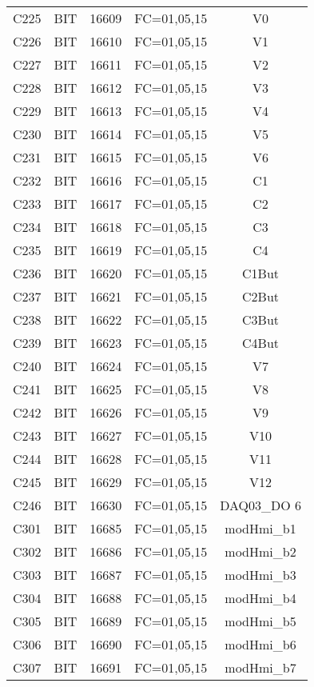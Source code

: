 \begin{center}
\begin{longtable}[c]{ |c|c|c|c|c| }
        C225	&	BIT	&	16609	&	FC=01,05,15	&	V0\\
        C226	&	BIT	&	16610	&	FC=01,05,15	&	V1\\
        C227	&	BIT	&	16611	&	FC=01,05,15	&	V2\\
        C228	&	BIT	&	16612	&	FC=01,05,15	&	V3\\
        C229	&	BIT	&	16613	&	FC=01,05,15	&	V4\\
        C230	&	BIT	&	16614	&	FC=01,05,15	&	V5\\
        C231	&	BIT	&	16615	&	FC=01,05,15	&	V6\\
        C232	&	BIT	&	16616	&	FC=01,05,15	&	C1\\
        C233	&	BIT	&	16617	&	FC=01,05,15	&	C2\\
        C234	&	BIT	&	16618	&	FC=01,05,15	&	C3\\
        C235	&	BIT	&	16619	&	FC=01,05,15	&	C4\\
        C236	&	BIT	&	16620	&	FC=01,05,15	&	C1But\\
        C237	&	BIT	&	16621	&	FC=01,05,15	&	C2But\\
        C238	&	BIT	&	16622	&	FC=01,05,15	&	C3But\\
        C239	&	BIT	&	16623	&	FC=01,05,15	&	C4But\\
        C240	&	BIT	&	16624	&	FC=01,05,15	&	V7\\
        C241	&	BIT	&	16625	&	FC=01,05,15	&	V8\\
        C242	&	BIT	&	16626	&	FC=01,05,15	&	V9\\
        C243	&	BIT	&	16627	&	FC=01,05,15	&	V10\\
        C244	&	BIT	&	16628	&	FC=01,05,15	&	V11\\
        C245	&	BIT	&	16629	&	FC=01,05,15	&	V12\\
        C246	&	BIT	&	16630	&	FC=01,05,15	&	DAQ03\_DO 6\\
        C301	&	BIT	&	16685	&	FC=01,05,15	&	modHmi\_b1\\
        C302	&	BIT	&	16686	&	FC=01,05,15	&	modHmi\_b2\\
        C303	&	BIT	&	16687	&	FC=01,05,15	&	modHmi\_b3\\
        C304	&	BIT	&	16688	&	FC=01,05,15	&	modHmi\_b4\\
        C305	&	BIT	&	16689	&	FC=01,05,15	&	modHmi\_b5\\
        C306	&	BIT	&	16690	&	FC=01,05,15	&	modHmi\_b6\\
        C307	&	BIT	&	16691	&	FC=01,05,15	&	modHmi\_b7\\

\end{longtable}
\end{center}
